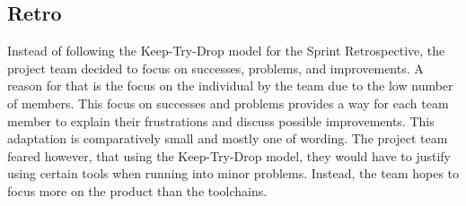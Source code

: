 \subsection{Retro}
Instead of following the Keep-Try-Drop model for the Sprint Retrospective, the project team decided to focus on successes, problems, and improvements. A reason for that is the
focus on the individual by the team due to the low number of members. This focus on successes and problems provides a way for each team member to explain their frustrations and discuss possible improvements.
This adaptation is comparatively small and mostly one of wording. The project team feared however, that using the Keep-Try-Drop model, they would have to justify using certain tools when running into minor
problems. Instead, the team hopes to focus more on the product than the toolchains.